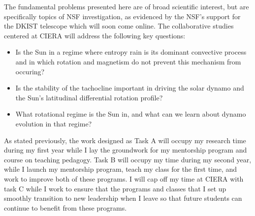 \documentclass[aasms,11pt, longbibliography]{article}
\begin{document}
The fundamental problems presented here are of broad scientific interest, but are specifically topics of NSF investigation, as evidenced by the NSF's support for the DKIST telescope which will soon come online.
The collaborative studies centered at CIERA will address the following key questions:
\begin{itemize}
\vspace{-9pt}
\item Is the Sun in a regime where entropy rain is its dominant convective process and in which rotation and magnetism do not prevent this mechanism from occuring?
\vspace{-9pt}
\item Is the stability of the tachocline important in driving the solar dynamo and the Sun's latitudinal differential rotation profile?
\vspace{-9pt}
\item What rotational regime is the Sun in, and what can we learn about dynamo evolution in that regime?
\vspace{-9pt}
\end{itemize}

As stated previously, the work designed as Task A will occupy my research time during my first year while I lay the groundwork for my mentorship program and course on teaching pedagogy.
Task B will occupy my time during my second year, while I launch my mentorship program, teach my class for the first time, and work to improve both of these programs.
I will cap off my time at CIERA with task C while I work to ensure that the programs and classes that I set up smoothly transition to new leadership when I leave so that future students can continue to benefit from these programs.


\newpage


\end{document}
